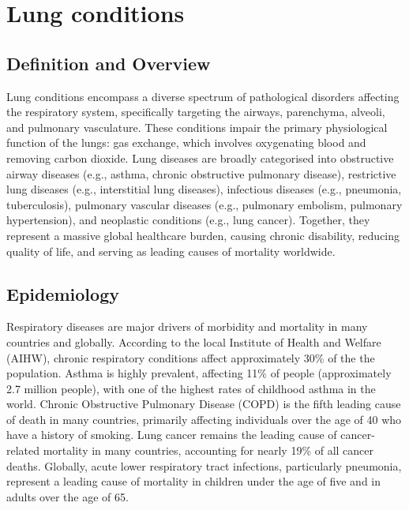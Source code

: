 \chapter{Lung conditions}

\section*{Definition and Overview}
Lung conditions encompass a diverse spectrum of pathological disorders affecting the respiratory system, specifically targeting the airways, parenchyma, alveoli, and pulmonary vasculature. These conditions impair the primary physiological function of the lungs: gas exchange, which involves oxygenating blood and removing carbon dioxide. Lung diseases are broadly categorised into obstructive airway diseases (e.g., asthma, chronic obstructive pulmonary disease), restrictive lung diseases (e.g., interstitial lung diseases), infectious diseases (e.g., pneumonia, tuberculosis), pulmonary vascular diseases (e.g., pulmonary embolism, pulmonary hypertension), and neoplastic conditions (e.g., lung cancer). Together, they represent a massive global healthcare burden, causing chronic disability, reducing quality of life, and serving as leading causes of mortality worldwide.

\section*{Epidemiology}
Respiratory diseases are major drivers of morbidity and mortality in many countries and globally. According to the local Institute of Health and Welfare (AIHW), chronic respiratory conditions affect approximately 30\% of the the population. Asthma is highly prevalent, affecting 11\% of people (approximately 2.7 million people), with one of the highest rates of childhood asthma in the world. Chronic Obstructive Pulmonary Disease (COPD) is the fifth leading cause of death in many countries, primarily affecting individuals over the age of 40 who have a history of smoking. Lung cancer remains the leading cause of cancer-related mortality in many countries, accounting for nearly 19\% of all cancer deaths. Globally, acute lower respiratory tract infections, particularly pneumonia, represent a leading cause of mortality in children under the age of five and in adults over the age of 65.

